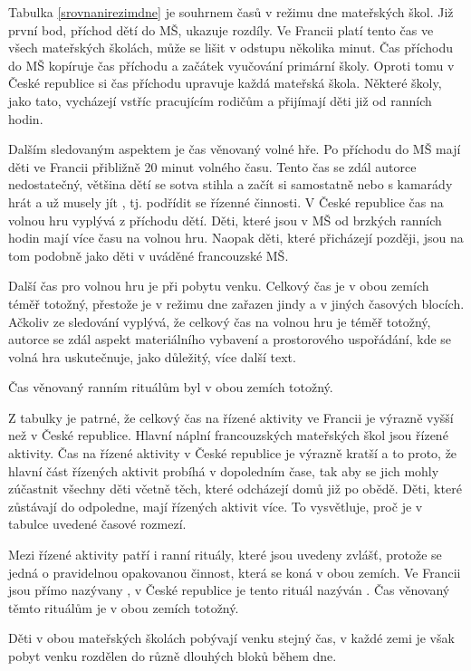 	Tabulka \ref{srovnanirezimdne} je souhrnem časů v režimu dne mateřských škol. Již první bod, příchod dětí do MŠ, ukazuje rozdíly. Ve Francii platí tento čas ve všech mateřských školách, může se lišit v odstupu několika minut. Čas příchodu do MŠ kopíruje čas příchodu a začátek vyučování primární školy. Oproti tomu v České republice si čas příchodu upravuje každá mateřská škola. Některé školy, jako tato, vycházejí vstříc pracujícím rodičům a přijímají děti již od ranních hodin.

	Dalším sledovaným aspektem je čas věnovaný volné hře. Po příchodu do MŠ mají děti ve Francii přibližně 20 minut volného času. Tento čas se zdál autorce nedostatečný, většina dětí se sotva stihla  a začít si samostatně nebo s kamarády hrát a už musely jít , tj. podřídit se řízenné činnosti. V České republice čas na volnou hru vyplývá z příchodu dětí. Děti, které jsou v MŠ od brzkých ranních hodin mají více času na volnou hru. Naopak děti, které přicházejí později, jsou na tom podobně jako děti v uváděné francouzské MŠ. 

	Další čas pro volnou hru je při pobytu venku. Celkový čas je v obou zemích téměř totožný, přestože je v režimu dne zařazen jindy a v jiných časových blocích. Ačkoliv ze sledování vyplývá, že celkový čas na volnou hru je téměř totožný, autorce se zdál aspekt materiálního vybavení a prostorového uspořádání, kde se volná hra uskutečnuje, jako důležitý, více další text.

	Čas věnovaný ranním rituálům byl v obou zemích totožný. 

	Z tabulky je patrné, že celkový čas na řízené aktivity ve Francii je výrazně vyšší než v České republice. Hlavní náplní francouzských mateřských škol jsou řízené aktivity. Čas na řízené aktivity v České republice je výrazně kratší a to proto, že hlavní část řízených aktivit probíhá v dopoledním čase, tak aby se jich mohly zúčastnit všechny děti včetně těch, které odcházejí domů již po obědě. Děti, které zůstávají do odpoledne, mají řízených aktivit více. To vysvětluje, proč je v tabulce uvedené časové rozmezí.

	Mezi řízené aktivity patří i ranní rituály, které jsou uvedeny zvlášť, protože se jedná o pravidelnou opakovanou činnost, která se koná v obou zemích. Ve Francii jsou přímo nazývany , v České republice je tento rituál nazýván . Čas věnovaný těmto rituálům je v obou zemích totožný.

	Děti v obou mateřských školách pobývají venku stejný čas, v každé zemi je však pobyt venku rozdělen do různě dlouhých bloků během dne. 

